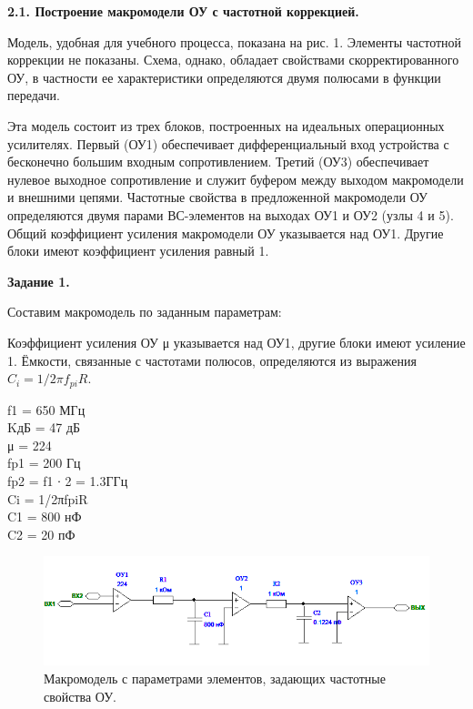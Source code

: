 \documentclass[a4paper,14pt]{extarticle}
\begin{document}
    \newpage
    \begin{center}
        \textbf{2.1. Построение макромодели ОУ с частотной коррекцией.}
    \end{center}
    
    Модель, удобная для учебного процесса, показана на рис. 1. Элементы 
    частотной коррекции не показаны. Схема, однако, обладает свойствами 
    скорректированного ОУ, в частности ее характеристики определяются 
    двумя полюсами в функции передачи.

    Эта модель состоит из трех блоков, построенных на идеальных 
    операционных усилителях. Первый (ОУ1) обеспечивает дифференциальный 
    вход устройства с бесконечно большим входным сопротивлением. Третий 
    (ОУ3) обеспечивает нулевое выходное сопротивление и служит буфером 
    между выходом макромодели и внешними цепями. Частотные свойства в 
    предложенной макромодели ОУ определяются двумя парами ВС-элементов на 
    выходах ОУ1 и ОУ2 (узлы 4 и 5). Общий коэффициент усиления макромодели 
    ОУ указывается над ОУ1. Другие блоки имеют коэффициент усиления равный 1.

    \newpage

    \begin{center}
        \textbf{Задание 1.}
    \end{center}

    Составим макромодель по заданным параметрам:

    Коэффициент усиления ОУ μ указывается над ОУ1, другие блоки имеют 
    усиление 1. Ёмкости, связанные с частотами полюсов, определяются из 
    выражения $C_i=1/2πf_{pi}R$.\\
    \vspace{-1cm}
    \begin{multicols}{2}
    \noindent f1 = 650 МГц\\
    KдБ = 47 дБ\\
    μ = 224\\
    \columnbreak
    fp1 = 200 Гц\\
    fp2 = f1 ∙ 2 = 1.3ГГц\\
    Ci = 1/2πfpiR\\
    C1 = 800 нФ\\
    C2 = 20 пФ\\
    \end{multicols}
    \begin{figure}[h!]
        \begin{center}
            \includegraphics[scale=0.9]{1.png}
            \caption{Макромодель с параметрами элементов, задающих частотные свойства ОУ.}
        \end{center}
    \end{figure}
\end{document}
